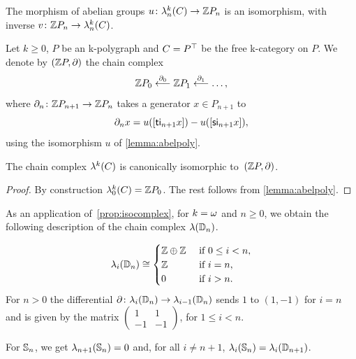 \begin{lemma}\label{lemma:abelpoly}
  The morphism of abelian groups $u \colon \mathsf{\mathsf{\lambda}}^{k}_n(C) \to \mathbb Z P_n$ is an
  isomorphism, with inverse $v \colon \mathbb Z P_n \to \mathsf{\mathsf{\lambda}}^{k}_n(C)$.
\end{lemma}
\begin{paragr}
  Let $k \geq 0$, $P$ be an \ook k-polygraph and $C=P^\top$ be the free
  \ook k-category on $P$. We denote by $(\mathbb Z P,\partial)$ the chain complex
  \[
    \mathbb Z P_0 \overset{\partial_0}{\longleftarrow} \mathbb Z P_1
    \overset{\partial_1}{\longleftarrow} \dots,
    \]
  where $\partial_n\colon \mathbb Z P_{n+1}\to \mathbb Z P_n$ takes a generator $x\in
  P_{n+1}$ to
  \[\partial_n x=u([\mathsf{t}\mathsf{i}_{n+1} x])-u([\mathsf{s}\mathsf{i}_{n+1}
    x]),\]
  using the isomorphism $u$ of \cref{lemma:abelpoly}. 
\end{paragr}
\begin{proposition}\label{prop:isocomplex}
  The chain complex $\mathsf{\mathsf{\lambda}}^{k}(C)$
  is canonically isomorphic to~$(\mathbb Z P,\partial)$.
  \end{proposition}

\begin{proof}
  By construction $\mathsf{\mathsf{\lambda}}^{k}_0(C)=\mathbb Z P_0$. The rest follows
  from \cref{lemma:abelpoly}.
\end{proof}
\begin{paragr}\label{paragr:abeldisk}
  
  As an application of~\cref{prop:isocomplex}, for $k=\omega$ and $n\geq
  0$,  we obtain the following description of the chain complex $\mathsf{\lambda}(\mathbb{D}_{n})$.

  \[
    \mathsf{\lambda}_i(\mathbb{D}_{n})\cong \begin{cases}
      \mathbb Z\oplus\mathbb Z &\text{ if } 0 \leq i < n,\\
      \mathbb Z &\text{ if } i=n,\\
        0 &\text{ if } i>n. \end{cases}
  \]
  For $n>0$ the differential $\partial
  \colon \mathsf{\lambda}_i(\mathbb{D}_{n}) \to \mathsf{\lambda}_{i-1}(\mathbb{D}_{n})$ sends $1$ to
  $(1,-1)$ for $i=n$ and is given by the matrix $\begin{pmatrix} 1 & 1
    \\ -1 & -1 \end{pmatrix}$, 
  for $1 \leq i < n$.

  For $\mathbb{S}_{n}$, we get $\mathsf{\lambda}_{n+1}(\mathbb{S}_{n})=0$ and, for all $i\neq n+1$, $\mathsf{\lambda}_i(\mathbb{S}_{n})=\mathsf{\lambda}_i(\mathbb{D}_{n+1})$. 
\end{paragr}

